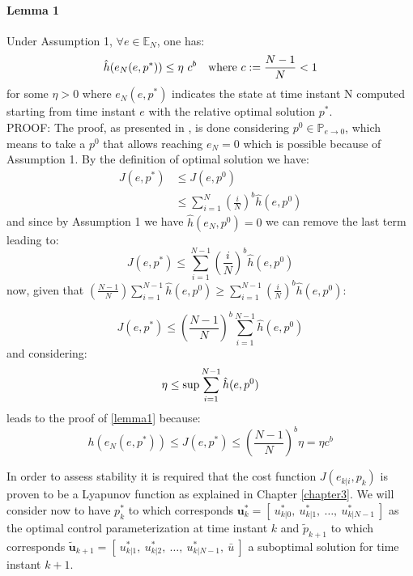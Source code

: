 \paragraph{Lemma 1} Under Assumption 1, $\forall e \in \mathbb{E}_N$, one has:
\begin{equation}
	\hat{h}(e_N(e,p^*)) \leq \eta\ c^b\ \ \  \textnormal{where    } c:=\frac{N-1}{N} < 1
 	\label{lemma1}
\end{equation}
for some $\eta > 0$ where $e_N(e,p^*)$ indicates the state at time instant N computed starting from time instant $e$ with the relative optimal solution $p^*$. \\

{PROOF:} The proof, as presented in \cite{alamir2018stability}, is done considering $p^0 \in \mathbb{P}_{e \to 0}$, which means to take a $p^0$ that allows reaching $e_N=0$ which is possible because of Assumption 1. By the definition of optimal solution we have: 
\begin{equation}
\begin{split}
	J(e,p^*)&\leq J(e,p^0) \\
	&\leq \sum_{i=1}^{N}\left(\frac{i}{N}\right)^b\hat{h}(e,p^0)
\end{split}
\end{equation}
and since by Assumption 1 we have $\hat{h}(e_N,p^0)=0$ we can remove the last term leading to:
\begin{equation}
	J(e,p^*)\leq \sum_{i=1}^{N-1}\left(\frac{i}{N}\right)^b\hat{h}(e,p^0)
\end{equation}
now, given that $\left(\frac{N-1}{N}\right)\sum_{i=1}^{N-1}\hat{h}(e,p^0) \geq \sum_{i=1}^{N-1}\left(\frac{i}{N}\right)^b\hat{h}(e,p^0)$:

\begin{equation}
	J(e,p^*)\leq \left(\frac{N-1}{N}\right)^b\sum_{i=1}^{N-1}\hat{h}(e,p^0)
\end{equation}
and considering:
\begin{equation}
 \eta \leq \textnormal{sup} \sum_{i=1}^{N-1}\hat{h}(e,p^0)
\end{equation}
leads to the proof of \ref{lemma1} because: 
\begin{equation}
h(e_N(e,p^*))\leq J(e,p^*) \leq \left(\frac{N-1}{N}\right)^b\eta = \eta c^b
\end{equation}

In order to assess stability it is required that the cost function $J({e}_{k|i},{p}_k)$ is proven to be a Lyapunov function as explained in Chapter \ref{chapter3}. 
We will consider now to have $p_k^*$ to which corresponds $\textbf{u}_k^*=[\ u_{k|0}^*,\ u_{k|1}^*,\  \dots,\  u_{k|{N-1}}^*\ ]$ as the optimal control parameterization at time instant $k$ and $\tilde{p}_{k+1}$ to which corresponds $\tilde{\textbf{u}}_{k+1}=[\ u_{k|1}^*,\ u_{k|2}^*,\  \dots,\  u_{k|{N-1}}^*,\ \bar{u} \ ]$ a suboptimal solution for time instant $k+1$.


